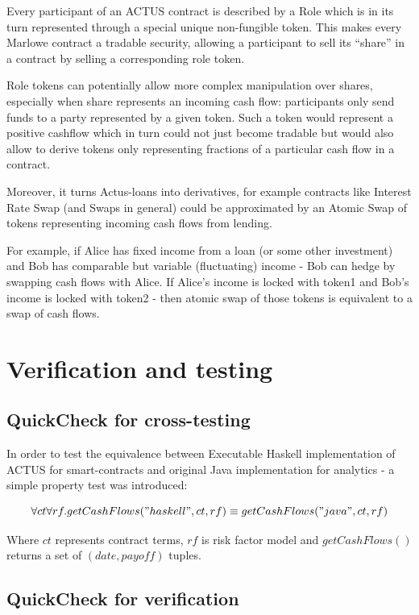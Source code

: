 \documentclass[runningheads]{llncs}
\begin{document}
Every participant of an ACTUS contract is described by a Role which
is in its turn represented through a special unique non-fungible token.
This makes every Marlowe contract a tradable security, allowing a
participant to sell its ``share'' in a contract by selling a corresponding
role token.

Role tokens can potentially allow more complex manipulation over shares,
especially when share represents an incoming cash flow: participants
only send funds to a party represented by a given token. Such a token
would represent a positive cashflow which in turn could not just become
tradable but would also allow to derive tokens only representing fractions
of a particular cash flow in a contract.

Moreover, it turns Actus-loans into derivatives, for example contracts
like Interest Rate Swap (and Swaps in general) could be approximated
by an Atomic Swap of tokens representing incoming cash flows from
lending.

For example, if Alice has fixed income from a loan (or some other
investment) and Bob has comparable but variable (fluctuating) income
- Bob can hedge by swapping cash flows with Alice. If Alice's income
is locked with token1 and Bob's income is locked with token2 - then
atomic swap of those tokens is equivalent to a swap of cash flows.

\section{Verification and testing}

\subsection{QuickCheck for cross-testing}

In order to test the equivalence between Executable Haskell implementation
of ACTUS for smart-contracts and original Java implementation for
analytics - a simple property test was introduced:

\smallskip
\noindent 
\begin{equation}
\forall ct\forall rf.getCashFlows("haskell",ct,rf)\equiv getCashFlows("java",ct,rf)
\end{equation}

Where $ct$ represents contract terms, $rf$ is risk factor model and
$getCashFlows()$ returns a set of $(date,payoff)$ tuples.

\subsection{QuickCheck for verification}
\end{document}
